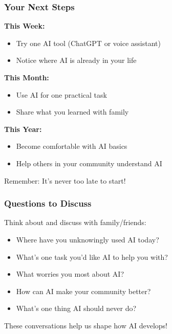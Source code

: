 \begin{frame}[fragile]\frametitle{Your Next Steps}

{\bf This Week:}
\begin{itemize}
\item Try one AI tool (ChatGPT or voice assistant)
\item Notice where AI is already in your life
\end{itemize}

{\bf This Month:}
\begin{itemize}
\item Use AI for one practical task
\item Share what you learned with family
\end{itemize}

{\bf This Year:}
\begin{itemize}
\item Become comfortable with AI basics
\item Help others in your community understand AI
\end{itemize}

\vspace{0.5cm}
Remember: It's never too late to start!
\end{frame}

\begin{frame}[fragile]\frametitle{Questions to Discuss}

Think about and discuss with family/friends:

\begin{itemize}
\item Where have you unknowingly used AI today?
\item What's one task you'd like AI to help you with?
\item What worries you most about AI?
\item How can AI make your community better?
\item What's one thing AI should never do?
\end{itemize}

\vspace{0.5cm}
These conversations help us shape how AI develops!
\end{frame}


